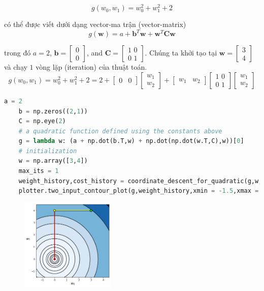\documentclass{book}
\begin{document}
\begin{equation*}
g(w_0,w_1) = w_0^2 + w_1^2 + 2
\end{equation*}

có thể được viết dưới dạng vector-ma trận (vector-matrix)
\begin{equation*}
    g\left(\mathbf{w}\right) = a + \mathbf{b}^{T}\mathbf{w} + \mathbf{w}^{T}\mathbf{C}\mathbf{w}
\end{equation*}

trong đó $a = 2$, $\mathbf{b} = \begin{bmatrix} 0 \\ 0 \end{bmatrix}$, and $\mathbf{C} = \begin{bmatrix} 1 \,\, 0 \\ 0 \,\, 1 \end{bmatrix}$.
Chúng ta khởi tạo tại $\mathbf{w} = \begin{bmatrix} 3 \\ 4 \end{bmatrix}$ và chạy $1$ vòng lặp (iteration) của thuật toán.
\begin{equation*}
    g(w_0,w_1) = w_0^2 + w_1^2 + 2 = 2 + \begin{bmatrix}0 & 0\end{bmatrix}\begin{bmatrix}w_1 \\ w_2\end{bmatrix} + \begin{bmatrix}w_1 & w_2\end{bmatrix} \begin{bmatrix} 1 \,\, 0 \\ 0 \,\, 1 \end{bmatrix} \begin{bmatrix}w_1 \\ w_2\end{bmatrix}
\end{equation*}
\begin{lstlisting}[language=python]
    a = 2
    b = np.zeros((2,1))
    C = np.eye(2)
    # a quadratic function defined using the constants above
    g = lambda w: (a + np.dot(b.T,w) + np.dot(np.dot(w.T,C),w))[0]
    # initialization
    w = np.array([3,4])
    max_its = 1
    weight_history,cost_history = coordinate_descent_for_quadratic(g,w,max_its,a,b,C)
    plotter.two_input_contour_plot(g,weight_history,xmin = -1.5,xmax = 4.5,ymin = -1.5,ymax = 4.5,num_contours = 30,show_original = False)
\end{lstlisting}
\begin{figure}[H]
    \centering
    \includegraphics[width=0.4\textwidth]{images/convex_quadratic_functions.png}
\end{figure}
\end{document}
